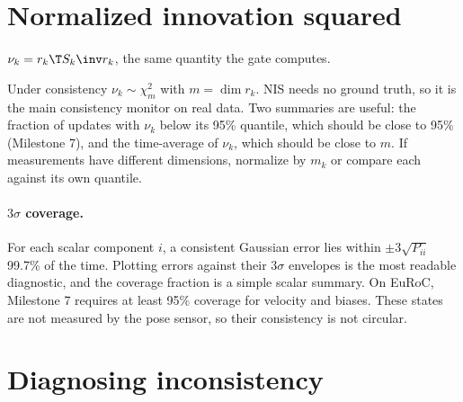 \section{Normalized innovation squared}

\begin{definition}[NIS]
$\nu_k = r_k\T S_k\inv r_k$, the same quantity the gate computes.
\end{definition}

Under consistency $\nu_k \sim \chi^2_m$ with $m = \dim r_k$. NIS needs no ground truth, so it is the main consistency
monitor on real data. Two summaries are useful: the fraction of updates with $\nu_k$ below its 95\% quantile, which
should be close to 95\% (Milestone 7), and the time-average of $\nu_k$, which should be close to $m$. If measurements have
different dimensions, normalize by $m_k$ or compare each against its own quantile.

\paragraph{$3\sigma$ coverage.} For each scalar component $i$, a consistent Gaussian error lies within $\pm3\sqrt{P_{ii}}$
99.7\% of the time. Plotting errors against their $3\sigma$ envelopes is the most readable diagnostic, and the coverage
fraction is a simple scalar summary. On EuRoC, Milestone 7 requires at least 95\% coverage for velocity and biases.
These states are not measured by the pose sensor, so their consistency is not circular.

\section{Diagnosing inconsistency}


